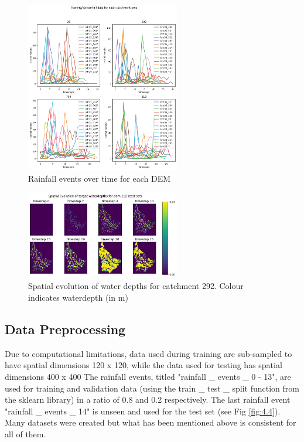 \begin{figure}[htbp]
	\includegraphics[width=0.6\textwidth]{../Figures/rainfall_train.png}
	\centering
	\caption[rainfall events]{Rainfall events over time for each DEM} 
	\label{fig:4.2}
\end{figure}

\begin{figure}[htbp]
	\includegraphics[width=0.6\textwidth]{../Figures/spatial_evoltution_waterdepth.png}
	\centering
	\caption[wd spatial evolution]{Spatial evolution of water depths for catchment 292. Colour indicates waterdepth (in m)} 
	\label{fig:4.3}
\end{figure}


\subsection{Data Preprocessing}
Due to computational limitations, data used during training are sub-sampled to have spatial dimensions 120 x 120, while the data used for testing has spatial dimensions 400 x 400 The rainfall events, titled "rainfall \_ events \_ 0 - 13", are used for training and validation data (using the train \_ test \_ split function from the sklearn library) in a ratio of 0.8 and 0.2 respectively. The last  rainfall  event "rainfall \_ events \_ 14" is unseen and used for the test set (see Fig \ref{fig:4.4}). \\
Many datasets were created but what has been mentioned above is consistent for all of them.

